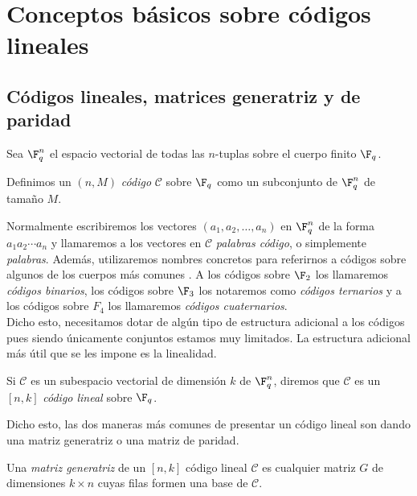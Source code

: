 \chapter{Conceptos básicos sobre códigos lineales}%
\label{chap:conceptos_básicos_sobre_códigos_lineales}

\section{Códigos lineales, matrices generatriz y de paridad}%
\label{sec:códigos_lineales_matrices_generatriz_y_de_paridad}

Sea \(\F_q^n\) el espacio vectorial de todas las \(n\)-tuplas sobre el cuerpo finito \(\F_q\).

\begin{definition}[Código]
 Definimos un \((n, M)\) \textit{código} \(\mathcal{C}\) sobre \(\F_q\) como un subconjunto de \(\F_q^n\) de tamaño \(M\).
\end{definition}

Normalmente escribiremos los vectores \((a_1, a_2, \dots, a_n)\) en \(\F_q^n\) de la forma \(a_1 a_2 \cdots a_n\) y llamaremos a los vectores en \(\mathcal{C}\) \textit{palabras código}, o simplemente \textit{palabras}. Además, utilizaremos nombres concretos para referirnos a códigos sobre algunos de los cuerpos más comunes . A los códigos sobre \(\F_2\) los llamaremos \textit{códigos binarios}, los códigos sobre \(\F_3\) los notaremos como \textit{códigos ternarios} y a los códigos sobre \(F_4\) los llamaremos \textit{códigos cuaternarios}.\\

Dicho esto, necesitamos dotar de algún tipo de estructura adicional a los códigos pues siendo únicamente conjuntos estamos muy limitados. La estructura adicional más útil que se les impone es la linealidad.

\begin{definition}
Si \(\mathcal{C}\) es un subespacio vectorial de dimensión \(k\) de \(\F_q^n\), diremos que \(\mathcal{C}\) es un \([n,k]\) \textit{código lineal} sobre \(\F_q\).
\end{definition}

Dicho esto, las dos maneras más comunes de presentar un código lineal son dando una matriz generatriz o una matriz de paridad.

\begin{definition}
    Una \textit{matriz generatriz} de un \([n,k]\) código lineal \(\mathcal{C}\) es cualquier matriz \(G\) de dimensiones \(k \times n\) cuyas filas formen una base de \(\mathcal{C}\).
\end{definition}

